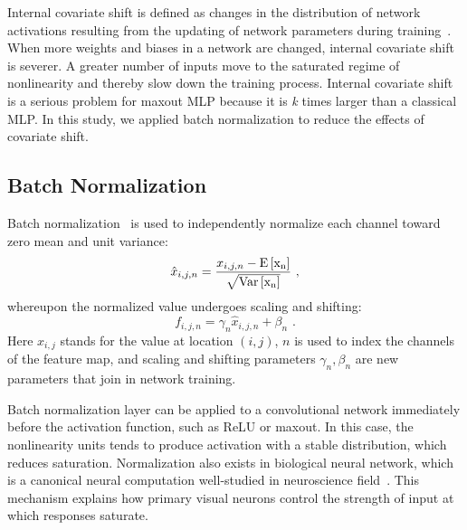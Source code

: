 \documentclass[10pt,twocolumn,letterpaper]{article}
\begin{document}
Internal covariate shift is defined as changes in the distribution of network activations resulting from the updating of network parameters during training~\cite{ioffe2015batch}. When more weights and biases in a network are changed, internal covariate shift is severer.
A greater number of inputs move to the saturated regime of nonlinearity and thereby slow down the training process. Internal covariate shift is a serious problem for maxout MLP because it is \textit{k} times larger than a classical MLP. In this study, we applied batch normalization to reduce the effects of covariate shift.

\subsection{Batch Normalization}
	Batch normalization~\cite{ioffe2015batch} is used to independently normalize each channel toward zero mean and unit variance:
\begin{equation}
	 \hat{x}_{i,j,n}=\frac{x_{i,j,n}-\rm E\left[x_n\right]}{\sqrt{\rm Var\left[x_n\right]}} \,\, ,
\end{equation}
whereupon the normalized value undergoes scaling and shifting:
\begin{equation}
	 f_{i,j,n}=\gamma_n{\hat{x}}_{i,j,n}+\beta_n  \,\, .
\end{equation}
Here  \begin{math} x_{i,j} \end{math} stands for the value at location  \begin{math} (i,j)\end{math},  \begin{math} n\end{math} is used to index the channels of the feature map, and scaling and shifting parameters  \begin{math} {\gamma_n,\beta_n} \end{math} are new parameters that join in network training.

Batch normalization layer can be applied to a convolutional network immediately before the activation function, such as ReLU or maxout.
In this case, the nonlinearity units tends to produce activation with a stable distribution, which reduces saturation.
Normalization also exists in biological neural network, which is a canonical neural computation well-studied in neuroscience field~\cite{carandini2012normalization}.
This mechanism explains how primary visual neurons control the strength of input at which responses saturate.
\end{document}
